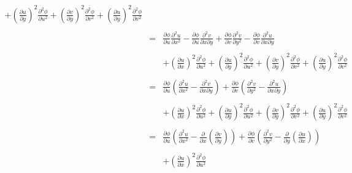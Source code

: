\documentclass[10pt]{amsart}
\theoremstyle{nonumberplain}
\begin{document}
\begin{enumerate}[label={\bf {\arabic*}:}]
\begin{eqnarray*}
												        	 + \left(\frac{\partial u}{\partial y}\right)^2 \frac{\partial^2 \phi}{\partial u^2}
													 + \left(\frac{\partial v}{\partial y}\right)^2 \frac{\partial^2 \phi}{\partial v^2} 
													 + \left(\frac{\partial u}{\partial y}\right)^2\frac{\partial^2 \phi}{\partial v^2} \\ \\
												&=& \frac{\partial\phi}{\partial u} \frac{\partial^2 u}{\partial x^2}
													- \frac{\partial\phi}{\partial u} \frac{\partial^2 v}{\partial x \partial y} 
													+ \frac{\partial\phi}{\partial v} \frac{\partial^2 v}{\partial y^2} 
													- \frac{\partial\phi}{\partial v} \frac{\partial^2 u}{\partial x \partial y}\\ \\
												    && +  \left(\frac{\partial u}{\partial x}\right)^2 \frac{\partial^2 \phi}{\partial u^2}
												        	 + \left(\frac{\partial u}{\partial y}\right)^2 \frac{\partial^2 \phi}{\partial u^2}
													 + \left(\frac{\partial v}{\partial y}\right)^2 \frac{\partial^2 \phi}{\partial v^2} 
													 + \left(\frac{\partial u}{\partial y}\right)^2\frac{\partial^2 \phi}{\partial v^2} \\ \\
												&=& \frac{\partial\phi}{\partial u} \left(\frac{\partial^2 u}{\partial x^2} - \frac{\partial^2 v}{\partial x \partial y} \right)
													+ \frac{\partial\phi}{\partial v} \left(\frac{\partial^2 v}{\partial y^2} - \frac{\partial^2 u}{\partial x \partial y} \right)\\ \\
												    && +  \left(\frac{\partial u}{\partial x}\right)^2 \frac{\partial^2 \phi}{\partial u^2}
												        	 + \left(\frac{\partial u}{\partial y}\right)^2 \frac{\partial^2 \phi}{\partial u^2}
													 + \left(\frac{\partial v}{\partial y}\right)^2 \frac{\partial^2 \phi}{\partial v^2} 
													 + \left(\frac{\partial u}{\partial y}\right)^2\frac{\partial^2 \phi}{\partial v^2} \\ \\
												&=& \frac{\partial\phi}{\partial u} \left(\frac{\partial^2 u}{\partial x^2} - \frac{\partial}{\partial x} \left(\frac{\partial v}{\partial y} \right)\right)
													+ \frac{\partial\phi}{\partial v} \left(\frac{\partial^2 v}{\partial y^2} - \frac{\partial}{\partial y} \left(\frac{\partial u}{\partial x} \right) \right) \\ \\
												    && +  \left(\frac{\partial u}{\partial x}\right)^2 \frac{\partial^2 \phi}{\partial u^2}

\end{eqnarray*}
\end{enumerate}
\end{document}

